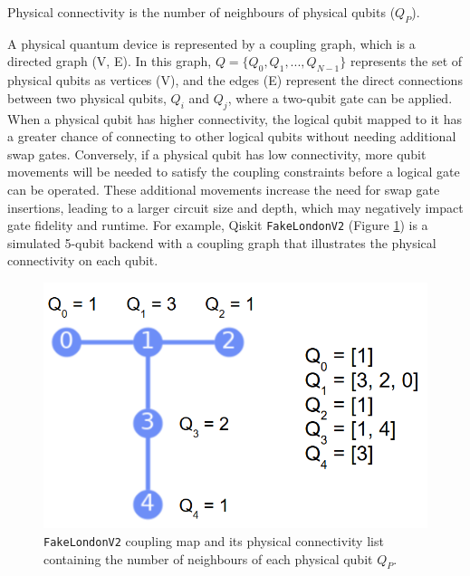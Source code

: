 \begin{definition} %
    Physical connectivity is the number of neighbours of physical qubits ($Q_P$).
\end{definition}
A physical quantum device is represented by a coupling graph, which is a directed graph (V, E). In this graph, $Q = \{Q_0, Q_1, ..., Q_{N-1}\}$ represents the set of physical qubits as vertices (V), and the edges (E) represent the direct connections between two physical qubits, $Q_i$ and $Q_j$, where a two-qubit gate can be applied. When a physical qubit has higher connectivity, the logical qubit mapped to it has a greater chance of connecting to other logical qubits without needing additional swap gates. Conversely, if a physical qubit has low connectivity, more qubit movements will be needed to satisfy the coupling constraints before a logical gate can be operated. These additional movements increase the need for swap gate insertions, leading to a larger circuit size and depth, which may negatively impact gate fidelity and runtime. For example, Qiskit \lstinline{FakeLondonV2} \cite{ibmquantum_fakelondonv2} (Figure \ref{fig:fake-london})  is a simulated 5-qubit backend with a coupling graph that illustrates the physical connectivity on each qubit.
\begin{figure}[h]
    \centering
    \includegraphics[width=0.5\linewidth]{image/fake_london.png}
    \caption{\lstinline{FakeLondonV2} coupling map and its physical connectivity list containing the number of neighbours of each physical qubit $Q_P$.}
    \label{fig:fake-london}
\end{figure}


